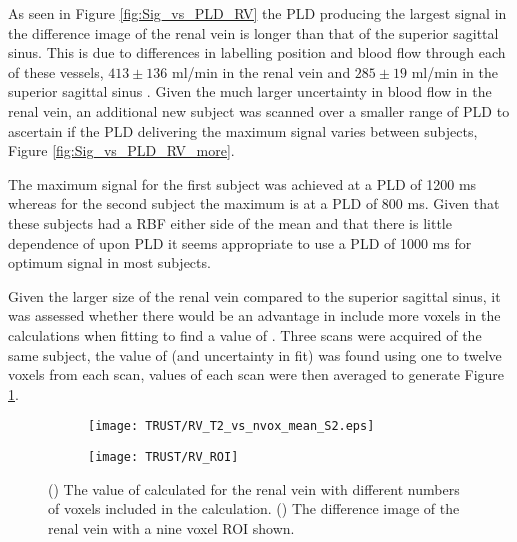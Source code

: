 As seen in Figure \ref{fig:Sig_vs_PLD_RV} the \ac{PLD} producing the largest signal in the difference image of the renal vein is longer than that of the superior sagittal sinus. This is due to differences in labelling position and blood flow through each of these vessels, $413\pm136$ ml/min in the renal vein \cite{cox_multiparametric_2017} and $285\pm19$ ml/min in the superior sagittal sinus \cite{jordan_velocity_1994}. Given the much larger uncertainty in blood flow in the renal vein, an additional new subject was scanned over a smaller range of \ac{PLD} to ascertain if the \ac{PLD} delivering the maximum signal varies between subjects, Figure \ref{fig:Sig_vs_PLD_RV_more}.

The maximum signal for the first subject was achieved at a \ac{PLD} of 1200 ms whereas for the second subject the maximum is at a \ac{PLD} of 800 ms. Given that these subjects had a \ac{RBF} either side of the mean and that there is little dependence of \ttwo upon \ac{PLD} it seems appropriate to use a \ac{PLD} of 1000 ms for optimum signal in most subjects.

Given the larger size of the renal vein compared to the superior sagittal sinus, it was assessed whether there would be an advantage in include more voxels in the calculations when fitting to find a value of \ttwo. Three scans were acquired of the same subject, the value of \ttwo (and uncertainty in fit) was found using one to twelve voxels from each scan, \ttwo values of each scan were then averaged to generate Figure \ref{fig:nvox_RV}.  

\begin{figure}[H]
	\centering
	\begin{subfigure}[c]{0.47\textwidth}
		\centering
		\texttt{[image: TRUST/RV\_T2\_vs\_nvox\_mean\_S2.eps]}
		\caption{}
		\label{fig:nvox_RV}
	\end{subfigure}
	\hfill
	\begin{subfigure}[c]{0.47\textwidth}
		\centering
		\texttt{[image: TRUST/RV\_ROI]}
		\caption{}
		\label{fig:RV_ROI}
	\end{subfigure}
	\caption{() The value of \ttwo calculated for the renal vein with different numbers of voxels included in the calculation. () The difference image of the renal vein with a nine voxel \ac{ROI} shown.}
	\label{fig:nv_RV}
\end{figure}


